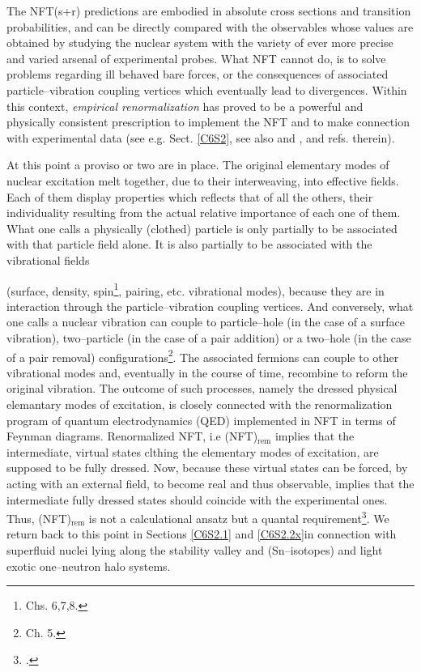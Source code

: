  
 
 The NFT(s+r) predictions are embodied in absolute cross sections and transition probabilities, and can be directly compared with the observables whose values are obtained by studying the nuclear system with  the variety of ever more precise and varied arsenal of experimental probes. What NFT cannot do, is to solve problems regarding ill behaved bare forces, or the consequences of associated particle--vibration coupling vertices which eventually lead to divergences. Within this context, \textit{empirical renormalization} has proved to be a powerful and physically consistent prescription to implement the NFT and to make connection with experimental data (see e.g. Sect. \ref{C6S2}, see also \cite{Barranco:04} and \cite{Broglia:16}, and refs. therein).

At this point a proviso or two are in place. The original elementary modes of nuclear excitation melt together, due to their interweaving, into effective fields. Each of them display properties which reflects that of all the others, their individuality resulting from the actual relative importance of each one of them. What one calls a physically  (clothed) particle is only partially to be associated with that particle field alone. It is also partially to be associated with the  vibrational fields

 (surface, density, spin\footnote{\cite{Bertsch:05} Chs. 6,7,8.}, pairing, etc. vibrational modes), 
 because they are in interaction through the particle--vibration coupling vertices. And conversely, what one calls a nuclear vibration can couple to  particle--hole (in the case of a surface vibration),  two--particle (in the case of a pair addition) or a two--hole (in the case of a pair removal)  configurations\footnote{\cite{Brink:05} Ch. 5.}. The associated fermions  can   couple to other vibrational modes and, eventually   in the course of time, recombine to reform the original vibration. The outcome of such processes, namely the dressed physical elemantary modes of excitation, is closely connected with the renormalization program of quantum electrodynamics (QED) implemented in NFT in terms of Feynman diagrams. Renormalized NFT, i.e (NFT)$_{\text{rem}}$ implies that the intermediate, virtual states clthing the elementary modes of excitation, are supposed to be fully dressed. Now, because these virtual states can be forced, by acting with an external field, to become real and thus observable, implies that the intermediate fully dressed states should coincide with the experimental ones. Thus, (NFT)$_{\text{rem}}$ is not a calculational ansatz but a quantal requirement\footnote{\cite{Broglia:16,Idini:15,Barranco:17}.}. We return back to this point in Sections \ref{C6S2.1} and \ref{C6S2.2x}in connection with superfluid nuclei lying along the stability valley and (Sn--isotopes) and light exotic one--neutron halo systems.
  
